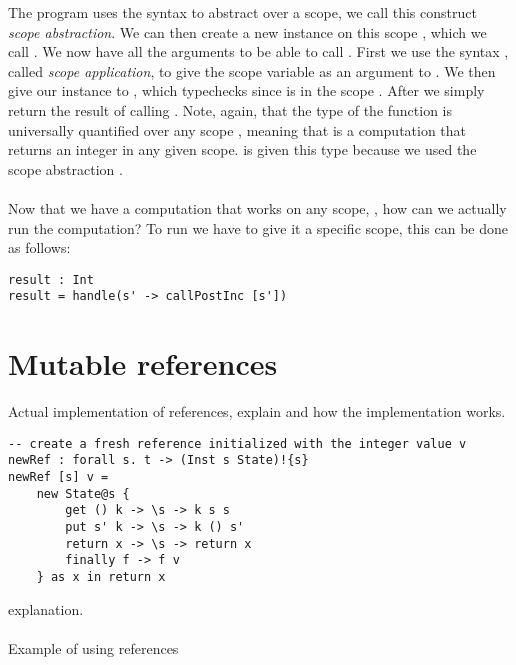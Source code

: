 The program  uses the syntax  to abstract over a scope, we call this construct \emph{scope abstraction}.
We can then create a new  instance on this scope , which we call .
We now have all the arguments to be able to call .
First we use the syntax , called \emph{scope application}, to give the scope variable as an argument to .
We then give our instance  to , which typechecks since  is in the scope .
After we simply return the result of calling .
Note, again, that the type of the function is universally quantified over any scope ,
meaning that  is a computation that returns an integer in any given scope.
 is given this  type because we used the scope abstraction .
\\\\
Now that we have a computation that works on any scope, , how can we actually run the computation?
To run  we have to give it a specific scope, this can be done as follows:
\begin{verbatim}
result : Int
result = handle(s' -> callPostInc [s'])
\end{verbatim}


\section{Mutable references}
Actual implementation of references, explain \ident{[s]} and how the implementation works.

\begin{verbatim}
-- create a fresh reference initialized with the integer value v
newRef : forall s. t -> (Inst s State)!{s}
newRef [s] v =
	new State@s {
		get () k -> \s -> k s s
		put s' k -> \s -> k () s'
		return x -> \s -> return x
		finally f -> f v
	} as x in return x
\end{verbatim}
explanation.
\\\\
Example of using references

